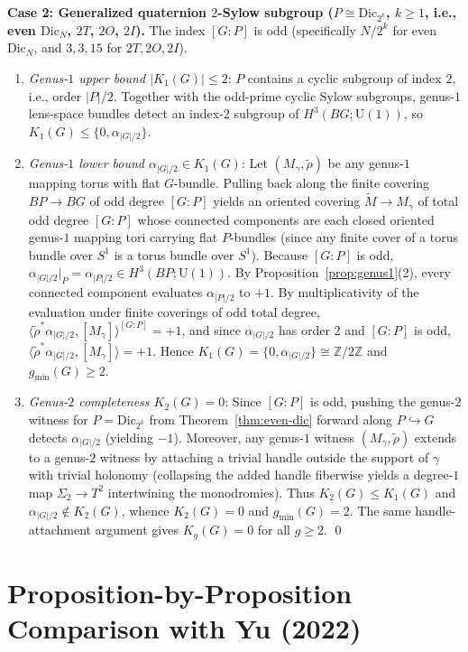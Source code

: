 \documentclass[11pt]{amsart}
\theoremstyle{definition}
\theoremstyle{remark}
\newcommand{\Z}{\mathbb{Z}}
\newcommand{\U}{\mathrm{U}}
\newcommand{\Dic}{\mathrm{Dic}}
\begin{document}
\textbf{Case 2: Generalized quaternion $2$-Sylow subgroup ($P \cong \Dic_{2^k}$, $k\ge 1$, i.e., even $\Dic_N$, $2T$, $2O$, $2I$).}
The index $[G:P]$ is odd (specifically $N/2^k$ for even $\Dic_N$, and $3, 3, 15$ for $2T, 2O, 2I$).
\begin{enumerate}
    \item \emph{Genus-$1$ upper bound $|K_1(G)| \le 2$}: $P$ contains a cyclic subgroup of index $2$, i.e., order $|P|/2$. Together with the odd-prime cyclic Sylow subgroups, genus-$1$ lens-space bundles detect an index-$2$ subgroup of $H^3(BG;\U(1))$, so $K_1(G) \le \{0, \alpha_{|G|/2}\}$.
    \item \emph{Genus-$1$ lower bound $\alpha_{|G|/2} \in K_1(G)$}: Let $(M_\gamma,\tilde{\rho})$ be any genus-$1$ mapping torus with flat $G$-bundle. Pulling back along the finite covering $BP \to BG$ of odd degree $[G:P]$ yields an oriented covering $\widetilde{M} \to M_\gamma$ of total odd degree $[G:P]$ whose connected components are each closed oriented genus-$1$ mapping tori carrying flat $P$-bundles (since any finite cover of a torus bundle over $S^1$ is a torus bundle over $S^1$).
    Because $[G:P]$ is odd, $\alpha_{|G|/2}|_P = \alpha_{|P|/2} \in H^3(BP;\U(1))$. By Proposition~\ref{prop:genus1}(2), every connected component evaluates $\alpha_{|P|/2}$ to $+1$. By multiplicativity of the evaluation under finite coverings of odd total degree, $\langle\tilde{\rho}^*\alpha_{|G|/2},[M_\gamma]\rangle^{[G:P]} = +1$, and since $\alpha_{|G|/2}$ has order $2$ and $[G:P]$ is odd, $\langle\tilde{\rho}^*\alpha_{|G|/2},[M_\gamma]\rangle = +1$.
    Hence $K_1(G) = \{0, \alpha_{|G|/2}\} \cong \Z/2\Z$ and $g_{\min}(G) \ge 2$.
    \item \emph{Genus-$2$ completeness $K_2(G)=0$}: Since $[G:P]$ is odd, pushing the genus-$2$ witness for $P = \Dic_{2^k}$ from Theorem~\ref{thm:even-dic} forward along $P \hookrightarrow G$ detects $\alpha_{|G|/2}$ (yielding $-1$). Moreover, any genus-$1$ witness $(M_\gamma, \tilde{\rho})$ extends to a genus-$2$ witness by attaching a trivial handle outside the support of $\gamma$ with trivial holonomy (collapsing the added handle fiberwise yields a degree-$1$ map $\Sigma_2\to T^2$ intertwining the monodromies). Thus $K_2(G) \le K_1(G)$ and $\alpha_{|G|/2}\notin K_2(G)$, whence $K_2(G)=0$ and $g_{\min}(G)=2$.
    The same handle-attachment argument gives $K_g(G)=0$ for all $g \ge 2$. \qed
\end{enumerate}

\section{Proposition-by-Proposition Comparison with Yu (2022)}
\end{document}
